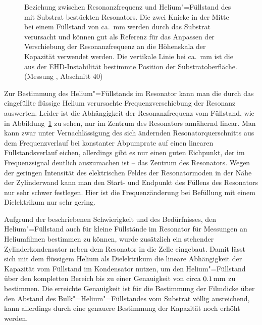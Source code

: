 \begin{figure}[h!]
	\hfill
	\begin{minipage}[b]{\textwidth-\smallwidth-\tabcolsep}
		\caption[Abhängigkeit der Resonanzfrequenz vom Helium"=Füllstand]{Beziehung zwischen Resonanzfrequenz und Helium"=Füllstand des mit Substrat bestückten Resonators. Die zwei Knicke in der Mitte bei einem Füllstand von ca.\ \unit[15]{mm} werden durch das Substrat verursacht und können gut als Referenz für das Anpassen der Verschiebung der Resonanzfrequenz an die Höhenskala der Kapazität verwendet werden. Die vertikale Linie bei ca.\ \unit[16]{mm} ist die aus der EHD-Instabilität bestimmte Position der Substrat\-oberfläche. (Messung , Abschnitt 40)}
		\label{fig:level}
	\end{minipage}
\end{figure}
Zur Bestimmung des Helium"=Füllstands im Resonator kann man die durch das eingefüllte flüssige Helium verursachte Frequenzverschiebung der Resonanz auswerten. Leider ist die Abhängigkeit der Resonanzfrequenz vom Füllstand, wie in Abbildung~\ref{fig:level} zu sehen, nur im Zentrum des Resonators annähernd linear. Man kann zwar unter Vernachlässigung des sich ändernden Resonatorquerschnitts aus dem Frequenzverlauf bei konstanter Abpumprate auf einen linearen Füllstandsverlauf eichen, allerdings gibt es nur einen guten Eichpunkt, der im Frequenzsignal deutlich auszumachen ist -- das Zentrum des Resonators. Wegen der geringen Intensität des elektrischen Feldes der Resonatormoden in der Nähe der Zylinderwand kann man den Start- und Endpunkt des Füllens des Resonators nur sehr schwer festlegen. Hier ist die Frequenzänderung bei Befüllung mit einem Dielektrikum nur sehr gering.

Aufgrund der beschriebenen Schwierigkeit und des Bedürfnisses, den Helium"=Füllstand auch für kleine Füllstände im Resonator für Messungen an Heliumfilmen bestimmen zu können, wurde zusätzlich ein stehender Zylinderkondensator neben dem Resonator in die Zelle eingebaut. Damit lässt sich mit dem flüssigem Helium als Dielektrikum die lineare Abhängigkeit der Kapazität vom Füllstand im Kondensator nutzen, um den Helium"=Füllstand über den kompletten Bereich bis zu einer Genauigkeit von circa $\unit[0.1]{mm}$ zu bestimmen. Die erreichte Genauigkeit ist für die Bestimmung der Filmdicke über den Abstand des Bulk"=Helium"=Füllstandes vom Substrat völlig ausreichend, kann allerdings durch eine genauere Bestimmung der Kapazität noch erhöht werden.

